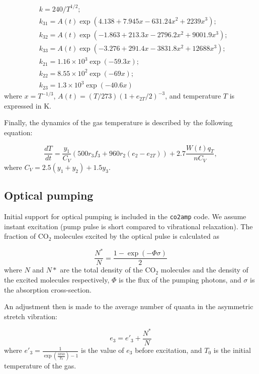 \documentclass{report}
\begin{document}
\begin{equation}
\begin{aligned}
&k = 240 / T^{1/2};\\
&k_{31} = A(t)\exp(4.138 + 7.945x - 631.24x^2 + 2239x^3);\\
&k_{32} = A(t)\exp(-1.863 + 213.3x - 2796.2x^2 + 9001.9x^3);\\
&k_{33} = A(t)\exp(-3.276 + 291.4x - 3831.8x^2 + 12688x^3);\\
&k_{21} = 1.16 \times 10^3 \exp(-59.3x);\\
&k_{22} = 8.55 \times 10^2 \exp(-69x);\\
&k_{23} = 1.3 \times 10^3 \exp(-40.6x)
\end{aligned}
\end{equation}
where $x=T^{-1/3}$, $A(t)=(T/273)(1+e_{2T}/2)^{-3}$, and temperature $T$ is expressed in K.

Finally, the dynamics of the gas temperature is described by the following equation:

\begin{equation}\label{eq:dTdt}
\frac{dT}{dt} = \frac{y_1}{C_V}(500r_3f_3 + 960r_2(e_2-e_{2T})) + 2.7\frac{W(t)q_T}{nC_V},
\end{equation}
where $C_V = 2.5(y_1+y_2) + 1.5y_3$.


\subsection{Optical pumping}
Initial support for optical pumping is included in the \texttt{co2amp} code. We assume instant excitation (pump pulse is short compared to vibrational relaxation).  The fraction of {CO$_2$} molecules excited by the optical pulse is calculated as

\begin{equation}\label{eq:OpticalPumping_N}
\frac{N^*}{N} = \frac{1-\exp(-\Phi \sigma)}{2}
\end{equation}
where $N$ and $N*$ are the total density of the {CO$_2$} molecules and the density of the excited molecules respectively, $\Phi$ is the flux of the pumping photons, and $\sigma$ is the absorption cross-section.

An adjustment then is made to the average number of quanta in the asymmetric stretch vibration:

\begin{equation}\label{eq:OpticalPumping_e3}
e_3 = e'_3 + \frac{N^*}{N}
\end{equation}
where $e'_3 = \frac{1}{\exp\left(\frac{3350}{T_0}\right)-1}$ is the value of $e_3$ before excitation, and $T_0$ is the initial temperature of the gas.
\end{document}
